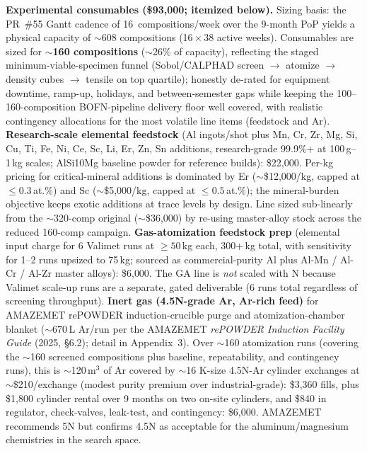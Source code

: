 \documentclass[11pt,letterpaper]{article}
\begin{document}
\textbf{Experimental consumables (\$93{,}000; itemized below).}
Sizing basis: the PR~\#55 Gantt cadence of 16~compositions/week over the
9-month PoP yields a physical capacity of $\sim$608 compositions
(16\,$\times$\,38 active weeks).  Consumables are sized for
\textbf{$\sim$160 compositions} ($\sim$26\% of capacity), reflecting
the staged minimum-viable-specimen funnel (Sobol/CALPHAD screen
$\to$ atomize $\to$ density cubes $\to$ tensile on top quartile);
honestly de-rated for equipment downtime, ramp-up, holidays, and
between-semester gaps while keeping the 100--160-composition
BOFN-pipeline delivery floor well covered, with realistic contingency
allocations for the most volatile line items (feedstock and Ar).
\textbf{Research-scale elemental feedstock} (Al ingots/shot plus Mn, Cr, Zr,
Mg, Si, Cu, Ti, Fe, Ni, Ce, Sc, Li, Er, Zn, Sn additions, research-grade
99.9\%+ at 100\,g--1\,kg scales; AlSi10Mg baseline powder for reference
builds): \$22{,}000.  Per-kg pricing for critical-mineral additions is
dominated by Er ($\sim$\$12{,}000/kg, capped at ${\leq}0.3$\,at.\%) and Sc
($\sim$\$5{,}000/kg, capped at ${\leq}0.5$\,at.\%); the mineral-burden
objective keeps exotic additions at trace levels by design.  Line sized
sub-linearly from the $\sim$320-comp original ($\sim$\$36{,}000) by
re-using master-alloy stock across the reduced 160-comp campaign.
\textbf{Gas-atomization feedstock prep} (elemental input charge for 6
Valimet runs at ${\geq}50$\,kg each, 300+\,kg total, with sensitivity for
1--2 runs upsized to 75\,kg; sourced as commercial-purity Al plus Al-Mn /
Al-Cr / Al-Zr master alloys): \$6{,}000.  The GA line is \emph{not} scaled
with N because Valimet scale-up runs are a separate, gated deliverable (6
runs total regardless of screening throughput).
\textbf{Inert gas (4.5N-grade Ar, Ar-rich feed)} for AMAZEMET rePOWDER
induction-crucible purge and atomization-chamber blanket
(${\sim}670$\,L Ar/run per the AMAZEMET \emph{rePOWDER Induction
Facility Guide} (2025, \S6.2); detail in Appendix~3).  Over $\sim$160
atomization runs (covering the $\sim$160 screened compositions plus
baseline, repeatability, and contingency runs), this is $\sim$120\,m$^{3}$
of Ar covered by $\sim$16 K-size 4.5N-Ar cylinder exchanges at
$\sim$\$210/exchange (modest purity premium over industrial-grade):
\$3{,}360 fills, plus \$1{,}800 cylinder rental over 9 months on two
on-site cylinders, and \$840 in regulator, check-valves, leak-test, and
contingency: \$6{,}000.  AMAZEMET recommends 5N but confirms 4.5N as
acceptable for the aluminum/magnesium chemistries in the search space.
\end{document}
